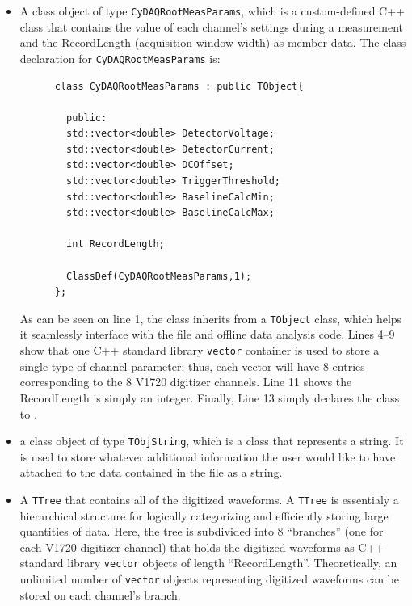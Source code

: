 \begin{itemize}
  \item{A class object of type \texttt{CyDAQRootMeasParams}, which is
    a custom-defined C++ class that contains the value of each
    channel's settings during a measurement and the RecordLength
    (acquisition window width) as member data. The class declaration
    for \texttt{CyDAQRootMeasParams} is:
    \begin{lstlisting}
      class CyDAQRootMeasParams : public TObject{

        public:
        std::vector<double> DetectorVoltage;
        std::vector<double> DetectorCurrent;
        std::vector<double> DCOffset;
        std::vector<double> TriggerThreshold;
        std::vector<double> BaselineCalcMin;
        std::vector<double> BaselineCalcMax;
        
        int RecordLength;
        
        ClassDef(CyDAQRootMeasParams,1);
      };
    \end{lstlisting}
    As can be seen on line 1, the class inherits from a \ROOT
    \texttt{TObject} class, which helps it seamlessly interface with
    the \ROOT file and \ROOT offline data analysis code. Lines 4--9
    show that one C++ standard library \texttt{vector} container is
    used to store a single type of channel parameter; thus, each
    vector will have 8 entries corresponding to the 8 V1720 digitizer
    channels. Line 11 shows the RecordLength is simply an
    integer. Finally, Line 13 simply declares the class to \ROOT.
  }
  \item{a class object of type \texttt{TObjString}, which is a \ROOT
    class that represents a string. It is used to store whatever
    additional information the user would like to have attached to the
    data contained in the \ROOT file as a string.}
  \item{A \ROOT \texttt{TTree} that contains all of the digitized
    waveforms. A \texttt{TTree} is essentialy a hierarchical structure
    for logically categorizing and efficiently storing large
    quantities of data. Here, the tree is subdivided into 8
    ``branches'' (one for each V1720 digitizer channel) that holds the
    digitized waveforms as C++ standard library \texttt{vector}
    objects of length ``RecordLength''. Theoretically, an unlimited
    number of \texttt{vector} objects representing digitized waveforms
    can be stored on each channel's branch.}
\end{itemize}

